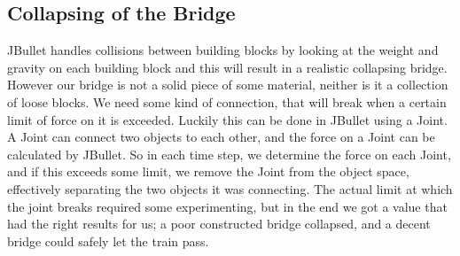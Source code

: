 \subsection{Collapsing of the Bridge}
JBullet handles collisions between building blocks by looking at the weight and gravity on each building block and this will result in a realistic collapsing bridge. However our bridge is not a solid piece of some material, neither is it a collection of loose blocks. We need some kind of connection, that will break when a certain limit of force on it is exceeded. Luckily this can be done in JBullet using a Joint. A Joint can connect two objects to each other, and the force on a Joint can be calculated by JBullet. So in each time step, we determine the force on each Joint, and if this exceeds some limit, we remove the Joint from the object space, effectively separating the two objects it was connecting. The actual limit at which the joint breaks required some experimenting, but in the end we got a value that had the right results for us; a poor constructed bridge collapsed, and a decent bridge could safely let the train pass.
